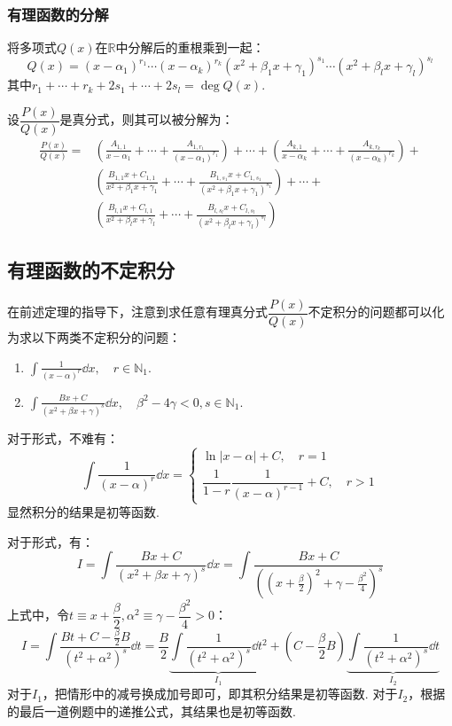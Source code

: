 \subsubsection{有理函数的分解}
将多项式$Q(x)$在$\mathbb{R}$中分解后的重根乘到一起：
\[Q(x) = (x-\alpha_1)^{r_1}\cdots(x-\alpha_k)^{r_k} (x^2+\beta_1 x+\gamma_1)^{s_1}\cdots(x^2+\beta_l x+\gamma_l)^{s_l}\]
其中$r_1 + \cdots + r_k + 2s_1 + \cdots + 2s_l = \deg Q(x)$.
\begin{theorem}
    设$\dfrac{P(x)}{Q(x)}$是真分式，则其可以被分解为：
    \begin{align*}
        \frac{P(x)}{Q(x)} =& \left(\frac{A_{1,1}}{x-\alpha_1} + \cdots + \frac{A_{1,r_1}}{(x-\alpha_1)^{r_1}}\right) + \cdots + \left(\frac{A_{k,1}}{x-\alpha_k} + \cdots + \frac{A_{k,r_k}}{(x-\alpha_k)^{r_k}}\right) + \\
        &\left(\frac{B_{1,1}x + C_{1,1}}{x^2 + \beta_1 x + \gamma_1} + \cdots + \frac{B_{1,s_1}x + C_{1,s_1}}{(x^2 + \beta_1 x + \gamma_1)^{s_1}}\right) + \cdots + \\
        &\left(\frac{B_{l,1}x + C_{l,1}}{x^2 + \beta_l x + \gamma_l} + \cdots + \frac{B_{l,s_l}x + C_{l,s_l}}{(x^2 + \beta_l x + \gamma_l)^{s_l}}\right)
    \end{align*}
\end{theorem}


\subsection{有理函数的不定积分}
在前述定理的指导下，注意到求任意有理真分式$\dfrac{P(x)}{Q(x)}$不定积分的问题都可以化为求以下两类不定积分的问题：
\begin{enumerate}[circ]
    \item $\displaystyle\int\frac{1}{(x-\alpha)^r}\dd{x},\quad r\in\mathbb{N}_1$.
    \item $\displaystyle\int\frac{Bx+C}{(x^2 + \beta x + \gamma)^s}\dd{x},\quad \beta^2-4\gamma<0,s\in\mathbb{N}_1$.
\end{enumerate}

对于形式，不难有：
\[\int\frac{1}{(x-\alpha)^r}\dd{x} = \begin{cases}
    \ln|x-\alpha| + C,\quad r=1\\
    \dfrac{1}{1-r}\dfrac{1}{(x-\alpha)^{r-1}} + C,\quad r>1
\end{cases}\]
显然积分的结果是初等函数.

对于形式，有：
\[I = \int\frac{Bx+C}{(x^2 + \beta x + \gamma)^s}\dd{x} = \int\frac{Bx+C}{\left(\left(x + \frac{\beta}{2}\right)^2 + \gamma - \frac{\beta^2}{4}\right)^s}\]
上式中，令$t \equiv x + \dfrac{\beta}{2}, \alpha^2 \equiv \gamma - \dfrac{\beta^2}{4} > 0$：
\[I = \int\frac{Bt + C - \frac{\beta}{2}B}{(t^2 + \alpha^2)^s}\dd{t} = \frac{B}{2}\underbrace{\int\frac{1}{(t^2+\alpha^2)^s}\dd{t^2}}_{I_1} + \left(C-\frac{\beta}{2}B\right)\underbrace{\int\frac{1}{(t^2+\alpha^2)^s}\dd{t}}_{I_2}\]
对于$I_1$，把情形中的减号换成加号即可，即其积分结果是初等函数.
对于$I_2$，根据的最后一道例题中的递推公式，其结果也是初等函数.

